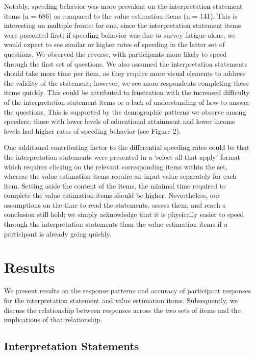 \documentclass{IEEEcsmag}
\begin{document}
Notably, speeding behavior was more prevalent on the interpretation statement items (n = 686) as compared to the value estimation items (n = 141). This is interesting on multiple fronts: for one, since the interpretation statement items were presented first; if speeding behavior was due to survey fatigue alone, we would expect to see similar or higher rates of speeding in the latter set of questions. We observed the reverse, with participants more likely to speed through the first set of questions. We also assumed the interpretation statements should take more time per item, as they require more visual elements to address the validity of the statement; however, we see more respondents completing these items quickly. This could be attributed to frustration with the increased difficulty of the interpretation statement items or a lack of understanding of how to answer the questions. This is supported by the demographic patterns we observe among speeders; those with lower levels of educational attainment and lower income levels had higher rates of speeding behavior (see Figure 2).

One additional contributing factor to the differential speeding rates could be that the interpretation statements were presented in a `select all that apply' format which requires clicking on the relevant corresponding items within the set, whereas the value estimation items require an input value separately for each item. Setting aside the content of the items, the minimal time required to complete the value estimation items should be higher. Nevertheless, our assumptions on the time to read the statements, assess them, and reach a conclusion still hold; we simply acknowledge that it is physically easier to speed through the interpretation statements than the value estimation items if a participant is already going quickly.

\section{Results}\label{results}

We present results on the response patterns and accuracy of participant responses for the interpretation statement and value estimation items. Subsequently, we discuss the relationship between responses across the two sets of items and the implications of that relationship.

\subsection{Interpretation Statements}\label{interpretation-statements}
\end{document}
